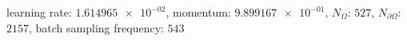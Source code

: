 learning rate: $\num[scientific-notation=true]{1.614965e-02}$, momentum: $\num[scientific-notation=true]{9.899167e-01}$, $N_{\Omega}$: $\num[scientific-notation=false]{527}$, $N_{\partial\Omega}$: $\num[scientific-notation=false]{2157}$, batch sampling frequency: $\num[scientific-notation=false]{543}$